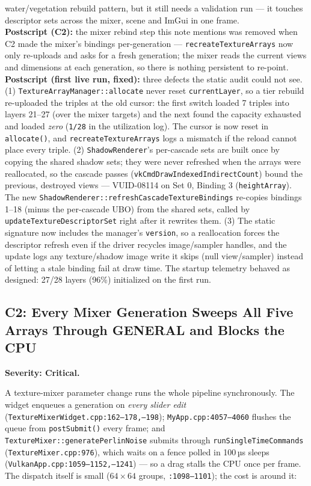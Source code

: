 \documentclass[11pt,a4paper]{article}
\begin{document}
\begin{tcolorbox}[promptbox={Prompt --- C1: content-sized texture arrays and utilization telemetry}]
water/vegetation rebuild pattern, but it still needs a validation run ---
it touches descriptor sets across the mixer, scene and ImGui in one frame.
\\ \textbf{Postscript (C2):} the mixer rebind step this note mentions was
removed when C2 made the mixer's bindings per-generation ---
\texttt{recreateTextureArrays} now only re-uploads and asks for a fresh
generation; the mixer reads the current views and dimensions at each
generation, so there is nothing persistent to re-point.
\\ \textbf{Postscript (first live run, fixed):} three defects the static
audit could not see. (1) \texttt{TextureArrayManager::allocate} never reset
\texttt{currentLayer}, so a tier rebuild re-uploaded the triples at the old
cursor: the first switch loaded 7 triples into layers 21--27 (over the mixer
targets) and the next found the capacity exhausted and loaded \emph{zero}
(\texttt{1/28} in the utilization log). The cursor is now reset in
\texttt{allocate()}, and \texttt{recreateTextureArrays} logs a mismatch if
the reload cannot place every triple. (2) \texttt{ShadowRenderer}'s
per-cascade sets are built once by copying the shared shadow sets; they were
never refreshed when the arrays were reallocated, so the cascade passes
(\texttt{vkCmdDrawIndexedIndirectCount}) bound the previous, destroyed views
--- VUID-08114 on Set 0, Binding 3 (\texttt{heightArray}). The new
\texttt{ShadowRenderer::refreshCascadeTextureBindings} re-copies bindings
1--18 (minus the per-cascade UBO) from the shared sets, called by
\texttt{updateTextureDescriptorSet} right after it rewrites them. (3) The
static signature now includes the manager's \texttt{version}, so a
reallocation forces the descriptor refresh even if the driver recycles
image/sampler handles, and the update logs any texture/shadow image write it
skips (null view/sampler) instead of letting a stale binding fail at draw
time. The startup telemetry behaved as designed: 27/28 layers (96\%)
initialized on the first run.
\end{tcolorbox}

\subsection{C2: Every Mixer Generation Sweeps All Five Arrays Through GENERAL and Blocks the CPU}
\label{sec:c2}

\textbf{Severity: Critical.}

A texture-mixer parameter change runs the whole pipeline synchronously. The
widget enqueues a generation on \emph{every slider edit}
(\texttt{TextureMixerWidget.cpp:162--178,--198}); \texttt{MyApp.cpp:4057--4060}
flushes the queue from \texttt{postSubmit()} every frame; and
\texttt{TextureMixer::generatePerlinNoise} submits through
\texttt{runSingleTimeCommands} (\texttt{TextureMixer.cpp:976}), which waits on a
fence polled in 100\,µs sleeps
(\texttt{VulkanApp.cpp:1059--1152,--1241}) ---
so a drag stalls the CPU once per frame. The dispatch itself is small
($64\times64$ groups, \texttt{:1098--1101}); the cost is around it:
\end{document}
